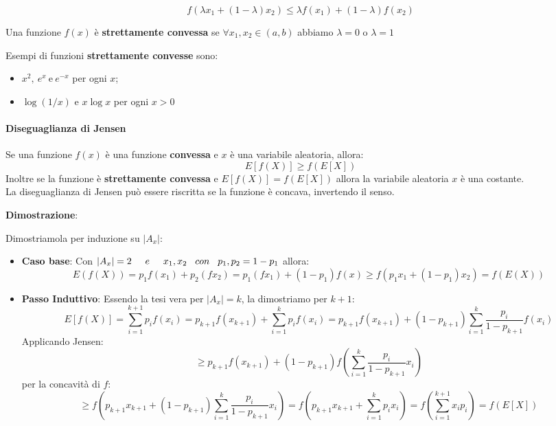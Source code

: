 \begin{equation}
	f(\lambda x_1  + (1-\lambda)x_2) \leq \lambda f(x_1) + (1-\lambda) f(x_2)
\end{equation}

Una funzione $f(x)$ è \textbf{strettamente convessa} se $\forall x_1, x_2 \in (a,b)$ abbiamo $\lambda = 0$ o $\lambda = 1$

Esempi di funzioni \textbf{strettamente convesse} sono:
\begin{itemize}
	\item $x^2,\ e^x\ \text{e}\ e^{-x}$ per ogni $x$;
	\item $\log(1/x)$ e $x \log x$ per ogni $x>0$
\end{itemize}

\paragraph{Diseguaglianza di Jensen}
Se una funzione $f(x)$ è una funzione \textbf{convessa} e $x$ è una variabile aleatoria, allora:
\begin{equation}
	E[f(X)] \geq f(E[X])
\end{equation}
Inoltre se la funzione è \textbf{strettamente convessa} e $E[f(X)] = f(E[X])$ allora la variabile aleatoria $x$ è una costante.\\ La diseguaglianza di Jensen può essere riscritta se la funzione è concava, invertendo il senso.

\textbf{Dimostrazione}:

Dimostriamola per induzione su $\left| A_x \right|$:
\begin{itemize}
	\item \textbf{Caso base}: Con $\left|A_x\right|=2 \hspace{0.5cm} e \hspace{0.5cm} x_1,x_2 \hspace{0.3cm} con \hspace{0.3cm} p_1,p_2=1-p_1$ allora: $$E(f(X))=p_1f(x_1)+p_2(fx_2)=p_1(fx_1)+(1-p_1)f(x)\ge f(p_1x_1+(1-p_1)x_2)=f(E(X))$$
	
	\item \textbf{Passo Induttivo}: Essendo la tesi vera per $\left| A_x \right| = k$, la dimostriamo per $k+1$:
	$$E[f(X)] = \sum^{k+1}_{i=1}p_if(x_i)=p_{k+1}f(x_{k+1})+\sum^k_{i=1}p_if(x_i) = p_{k+1}f(x_{k+1})+(1-p_{k+1})\sum^k_{i=1}\frac{p_i}{1-p_{k+1}}f(x_i)$$
	Applicando Jensen:
	$$\ge p_{k+1}f(x_{k+1})+(1-p_{k+1})f\left(\sum^k_{i=1}\frac{p_i}{1-p_{k+1}}x_i\right)$$
	per la concavità di $f$:
	$$\ge f\left(p_{k+1}x_{k+1}+(1-p_{k+1})\sum^k_{i=1}\frac{p_i}{1-p_{k+1}}x_i\right) = f\left(p_{k+1}x_{k+1}+\sum^k_{i=1}p_ix_i\right) = f\left( \sum^{k+1}_{i=1}x_ip_i\right)=f(E[X])$$
\end{itemize}

